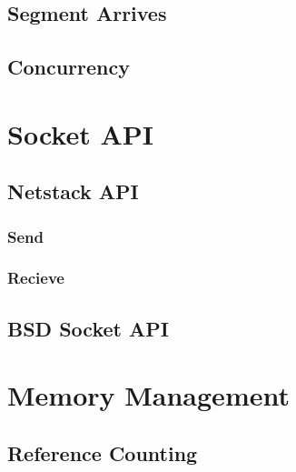         \subsection{Segment Arrives}






        \subsection{Concurrency}

    \section{Socket API}
        \subsection{Netstack API}

            \subsubsection{Send}

            \subsubsection{Recieve}


        \subsection{BSD Socket API}

    \section{Memory Management}

        \subsection{Reference Counting}


